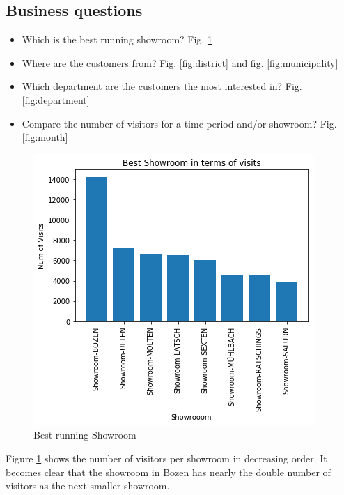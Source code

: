 \documentclass[letterpaper,12pt]{article}
\begin{document}
\subsection{Business questions}

\begin{itemize}
        \item Which is the best running showroom? Fig. \ref{fig:best_showroom}
        \item Where are the customers from? Fig. \ref{fig:district} and fig. \ref{fig:municipality}
        \item Which department are the customers the most interested in? Fig. \ref{fig:department}
        \item Compare the number of visitors for a time period and/or showroom? Fig. \ref{fig:month}
\end{itemize}


\begin{figure}[H] 
        \centering
        \includegraphics[width=\columnwidth]{../images/best_showroom.png}
        \caption{
                \label{fig:best_showroom}  
                Best running Showroom
        }
\end{figure}

Figure \ref{fig:best_showroom} shows the number of visitors per showroom in decreasing order. It becomes clear that the showroom in Bozen has nearly the double number of visitors as the next smaller showroom.
\end{document}
